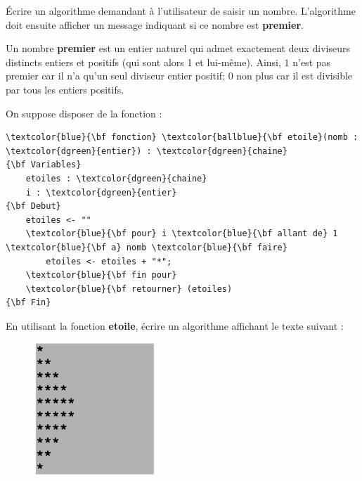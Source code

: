 \documentclass[11pt]{exam}
\begin{document}
\begin{questions}

\question \'Ecrire un algorithme demandant \`a l'utilisateur de saisir un nombre. L'algorithme doit ensuite afficher un message indiquant si ce nombre est \textbf{premier}. 

Un nombre \textbf{premier} est un entier naturel qui admet exactement deux diviseurs distincts entiers et positifs (qui sont alors 1 et lui-m\^eme). Ainsi, $1$ n'est pas premier car il n'a qu'un seul diviseur entier positif; $0$ non plus car il est divisible par tous les entiers positifs.

\question On suppose disposer de la fonction :

\begin{Verbatim}
\textcolor{blue}{\bf fonction} \textcolor{ballblue}{\bf etoile}(nomb : \textcolor{dgreen}{entier}) : \textcolor{dgreen}{chaine}
{\bf Variables}
	etoiles : \textcolor{dgreen}{chaine}
	i : \textcolor{dgreen}{entier}
{\bf Debut}
	etoiles <- ""
	\textcolor{blue}{\bf pour} i \textcolor{blue}{\bf allant de} 1 \textcolor{blue}{\bf a} nomb \textcolor{blue}{\bf faire} 
		etoiles <- etoiles + "*"; 
	\textcolor{blue}{\bf fin pour}
	\textcolor{blue}{\bf retourner} (etoiles) 
{\bf Fin}
\end{Verbatim}

En utilisant la fonction \textcolor{ballblue}{\bf etoile}, \'ecrire un algorithme affichant le texte suivant :

\begin{figure}[h!]
\centering
\includegraphics[height=5cm]{out1.png}
\captionsetup{labelformat=empty}
\end{figure}



\end{questions}
\end{document}
